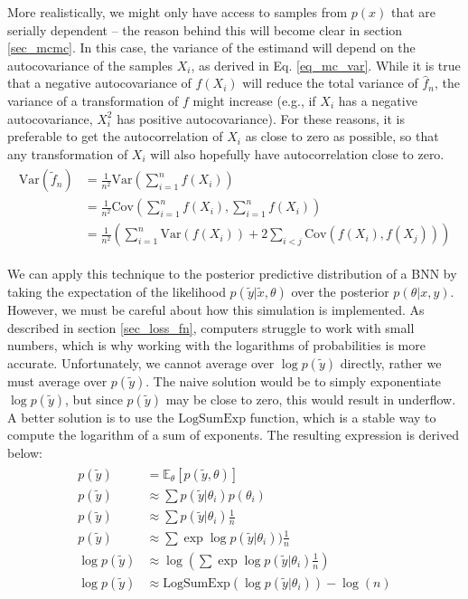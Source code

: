 \documentclass[12pt]{article}
\begin{document}
More realistically, we might only have access to samples from $p(x)$ that are serially dependent -- the reason behind this will become clear in section \ref{sec_mcmc}. In this case, the variance of the estimand will depend on the autocovariance of the samples $X_i$, as derived in Eq. \ref{eq_mc_var}. While it is true that a negative autocovariance of $f(X_i)$ will reduce the total variance of $\hat{f}_n$, the variance of a transformation of $f$ might increase (e.g., if $X_i$ has a negative autocovariance, $X_i^2$ has positive autocovariance). For these reasons, it is preferable to get the autocorrelation of $X_i$ as close to zero as possible, so that any transformation of $X_i$ will also hopefully have autocorrelation close to zero.
\begin{align}
\begin{split}
\text{Var} \left( \tilde{f}_n \right) &= \frac{1}{n^2} \text{Var} \left( \sum_{i=1}^n f(X_i)\right) \\
&= \frac{1}{n^2} \text{Cov} \left( \sum_{i=1}^n f\left(X_{i}\right), \sum_{i=1}^{n} f(X_{i})\right) \\
&=\frac{1}{n^2} \left (\sum_{i=1}^n \text{Var}(f(X_{i}))+2 \sum_{i<j} \text{Cov}(f(X_{i}), f(X_{j}))\right)
\end{split}
\label{eq_mc_var}
\end{align}

We can apply this technique to the posterior predictive distribution of a BNN by taking the expectation of the likelihood $p(\tilde{y}|\tilde{x},\theta)$ over the posterior $p(\theta|x,y)$. However, we must be careful about how this simulation is implemented. As described in section \ref{sec_loss_fn}, computers struggle to work with small numbers, which is why working with the logarithms of probabilities is more accurate. Unfortunately, we cannot average over $\log p(\tilde{y})$ directly, rather we must average over $p(\tilde{y})$. The naive solution would be to simply exponentiate $\log p(\tilde{y})$, but since $p(\tilde{y})$ may be close to zero, this would result in underflow. A better solution is to use the $\textrm{LogSumExp}$ function, which is a stable way to compute the logarithm of a sum of exponents. The resulting expression is derived below:
\begin{align}
\begin{split}
p(\tilde{y}) &= \mathbb{E}_\theta [p(\tilde{y}, \theta)] \\
p(\tilde{y}) &\approx \sum p(\tilde{y}|\theta_i) p(\theta_i) \\
p(\tilde{y}) &\approx \sum p(\tilde{y}|\theta_i) \frac{1}{n} \\
p(\tilde{y}) &\approx \sum \exp \log p(\tilde{y}|\theta_i)) \frac{1}{n} \\
\log p(\tilde{y}) &\approx \log(\sum \exp \log p(\tilde{y}|\theta_i) \frac{1}{n}) \\
\log p(\tilde{y}) &\approx \textrm{LogSumExp} (\log p(\tilde{y}|\theta_i)) - \log(n)
\end{split}
\end{align}
\end{document}
